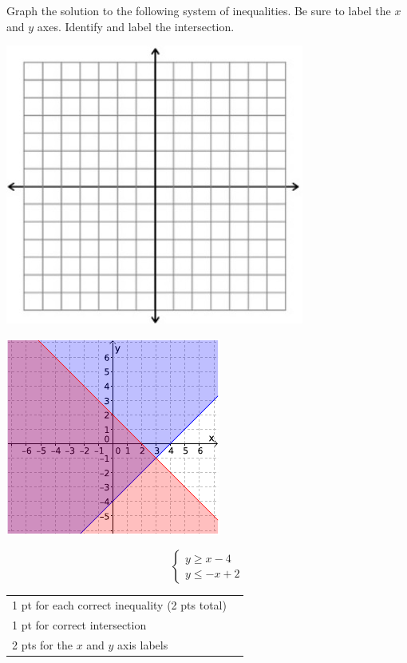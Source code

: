 {
	Graph the solution to the following system of inequalities. Be sure to label the $x$ and $y$ axes. Identify and label the intersection. \begin{onlyproblem}\begin{center}\includegraphics{fig-graphpaper.png}\end{center}\end{onlyproblem} \begin{onlysolution}\begin{center}\includegraphics{fig095-12-d-answer}\end{center}\end{onlysolution}
	$$\begin{cases}y\geq x-4\\ y\leq -x+2 \end{cases}$$
}
{
	\begin{tabular}{l r}
	1 pt for each correct inequality (2 pts total)\\
	1 pt for correct intersection\\
	2 pts for the $x$ and $y$ axis labels\\
	\end{tabular}
}
